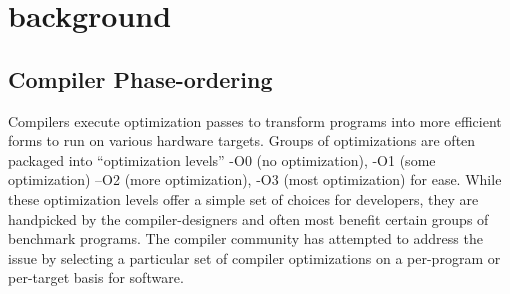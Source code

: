 \section{background} %
\label{sec:bg}

\subsection{Compiler Phase-ordering}
Compilers execute optimization passes to transform programs into more efficient forms to run on various hardware targets.
Groups of optimizations are often packaged into ``optimization levels'' -O0 (no optimization), -O1 (some optimization) –O2 (more optimization), -O3 (most optimization) for ease. 
While these optimization levels offer a simple set of choices for developers, they are handpicked by the compiler-designers and often most benefit certain groups of benchmark programs. 
The compiler community has attempted to address the issue by selecting a particular set of compiler optimizations on a per-program or per-target basis for software\cite{triantafyllis2003compiler,almagor2004finding,pan2006fast}.


